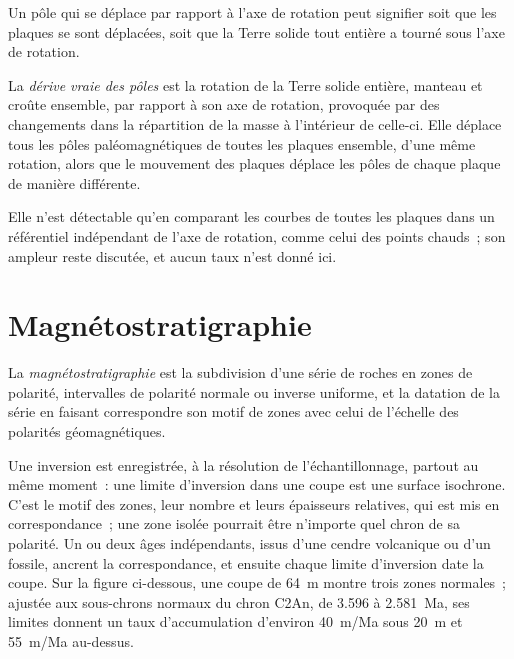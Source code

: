 Un pôle qui se déplace par rapport à l'axe de rotation peut signifier soit que les plaques
se sont déplacées, soit que la Terre solide tout entière a tourné sous l'axe de rotation.

\begin{definition}\label{def:b3:palaeomagnetism:tpw}
La \emph{dérive vraie des pôles} est la rotation de la Terre
solide entière, manteau et croûte ensemble, par rapport à son axe de rotation, provoquée
par des changements dans la répartition de la masse à l'intérieur de celle-ci. Elle déplace
tous les pôles paléomagnétiques de toutes les plaques ensemble, d'une même rotation, alors que
le mouvement des plaques déplace les pôles de chaque plaque de manière différente.
\end{definition}

Elle n'est détectable qu'en comparant les courbes de toutes les plaques dans un
référentiel indépendant de l'axe de rotation, comme celui des points chauds~; son
ampleur reste discutée, et aucun taux n'est donné ici.

\section{Magnétostratigraphie}

\begin{definition}[Magnétostratigraphie]\label{def:b3:palaeomagnetism:magnetostratigraphy}
La \emph{magnétostratigraphie} est la subdivision d'une
série de roches en zones de polarité, intervalles de polarité normale ou inverse uniforme,
et la datation de la série en faisant correspondre son motif de zones avec
celui de l'échelle des polarités géomagnétiques.
\end{definition}

Une inversion est enregistrée, à la résolution de l'échantillonnage, partout au même moment~:
une limite d'inversion dans une coupe est une surface isochrone.
C'est le motif des zones, leur nombre et leurs épaisseurs relatives, qui est mis en correspondance~;
une zone isolée pourrait être n'importe quel chron de sa polarité. Un ou deux
âges indépendants, issus d'une cendre volcanique ou d'un fossile, ancrent la correspondance, et
ensuite chaque limite d'inversion date la coupe. Sur la figure ci-dessous, une coupe de
\qty{64}{m} montre trois zones normales~; ajustée aux sous-chrons normaux du
chron C2An, de 3.596 à \qty{2.581}{Ma}, ses limites donnent un taux d'accumulation
d'environ \qty{40}{m/Ma} sous \qty{20}{m} et \qty{55}{m/Ma} au-dessus.

